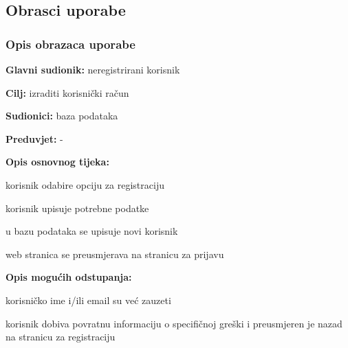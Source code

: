 \begin{packed_enum}
\begin{packed_enum}
				\end{packed_enum}
			\eject 
			
			
				
			\subsection{Obrasci uporabe}
				
				\subsubsection{Opis obrazaca uporabe}
					
					\noindent {}
					\begin{packed_item}
						
						\item \textbf{Glavni sudionik: }neregistrirani korisnik
						\item  \textbf{Cilj:} izraditi korisnički račun
						\item  \textbf{Sudionici:} baza podataka
						\item  \textbf{Preduvjet:} -
						\item  \textbf{Opis osnovnog tijeka:}
						
						\item[] \begin{packed_enum}
							
							\item korisnik odabire opciju za registraciju
							\item korisnik upisuje potrebne podatke
							\item u bazu podataka se upisuje novi korisnik
							\item web stranica se preusmjerava na stranicu za prijavu 
					
						\end{packed_enum}
						
						\item  \textbf{Opis mogućih odstupanja:}
						
						\item[] \begin{packed_item}
							
							\item[2.a] korisničko ime i/ili email su već zauzeti
							\item[] \begin{packed_enum}
								
								\item korisnik dobiva povratnu informaciju o specifičnoj greški i preusmjeren je nazad na stranicu za              registraciju
								

\end{packed_enum}
\end{packed_item}
\end{packed_item}
\end{packed_enum}
